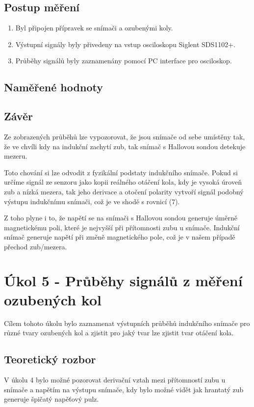 \documentclass{protokol}
\begin{document}
    \subsection{Postup měření}
        \begin{enumerate}
            \item Byl připojen přípravek se snímači a ozubenými koly.
            \item Výstupní signály byly přivedeny na vstup osciloskopu Siglent SDS1102+.
            \item Průběhy signálů byly zaznamenány pomocí PC interface pro osciloskop.
        \end{enumerate}
        
    \pagebreak
    \subsection{Naměřené hodnoty}

    \subsection{Závěr}
        Ze zobrazených průběhů lze vypozorovat, že jsou snímače od sebe umístěny tak, že ve chvíli kdy na indukční zachytí zub, tak snímač s Hallovou sondou detekuje mezeru.

        Toto chování si lze odvodit z fyzikální podstaty indukčního snímače. Pokud si určíme signál ze senzoru jako kopii reálného otáčení kola, kdy je vysoká úroveň zub a nízká mezera, tak jeho derivace a otočení polarity vytvoří signál podobný výstupu indukčnímu snímači, což je ve shodě s rovnicí (7).

        Z toho plyne i to, že napětí se na snímači s Hallovou sondou generuje úměrně magnetickému poli, které je nejvyšší při přítomnosti zubu u snímače. Indukční snímač generuje napětí při změně magnetického pole, což je v našem případě přechod zub/mezera.

\pagebreak

\section{Úkol 5 - Průběhy signálů z měření ozubených kol}
    Cílem tohoto úkolu bylo zaznamenat výstupních průběhů indukčního snímače pro různé tvary ozubených kol a zjistit pro jaký tvar lze zjistit tvar otáčení kola.
    \subsection{Teoretický rozbor}
        V úkolu 4 bylo možné pozorovat derivační vztah mezi přítomností zubu u snímače a napětím na výstupu snímače, kdy bylo možné vidět jak hrantatý zub generuje špičatý napěťový pulz.
\end{document}
